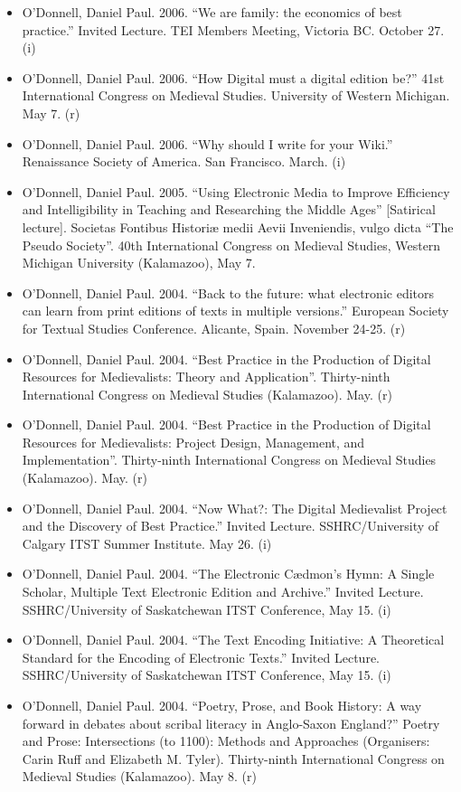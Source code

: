\documentclass[12pt]{article}
\begin{document}
\begin{itemize}
  \item O'Donnell, Daniel Paul. 2006. “We are family: the economics of best practice.” Invited Lecture. TEI Members Meeting, Victoria BC. October 27. (i)
  \item O'Donnell, Daniel Paul. 2006. “How Digital must a digital edition be?” 41st International Congress on Medieval Studies. University of Western Michigan. May 7. (r)
  \item O'Donnell, Daniel Paul. 2006. “Why should I write for your Wiki.” Renaissance Society of America. San Francisco. March. (i)
  \item O'Donnell, Daniel Paul. 2005. “Using Electronic Media to Improve Efficiency and Intelligibility in Teaching and Researching the Middle Ages” [Satirical lecture]. Societas Fontibus Historiæ medii Aevii Inveniendis, vulgo dicta “The Pseudo Society”. 40th International Congress on Medieval Studies, Western Michigan University (Kalamazoo), May 7.
  \item O'Donnell, Daniel Paul. 2004. “Back to the future: what electronic editors can learn from print editions of texts in multiple versions.” European Society for Textual Studies Conference. Alicante, Spain. November 24-25. (r)
  \item O'Donnell, Daniel Paul. 2004. “Best Practice in the Production of Digital Resources for Medievalists: Theory and Application”. Thirty-ninth International Congress on Medieval Studies (Kalamazoo). May. (r)
  \item O'Donnell, Daniel Paul. 2004. “Best Practice in the Production of Digital Resources for Medievalists: Project Design, Management, and Implementation”. Thirty-ninth International Congress on Medieval Studies (Kalamazoo). May. (r)
  \item O'Donnell, Daniel Paul. 2004. “Now What?: The Digital Medievalist Project and the Discovery of Best Practice.” Invited Lecture. SSHRC/University of Calgary ITST Summer Institute. May 26. (i)
  \item O'Donnell, Daniel Paul. 2004. “The Electronic Cædmon's Hymn: A Single Scholar, Multiple Text Electronic Edition and Archive.” Invited Lecture. SSHRC/University of Saskatchewan ITST Conference, May 15. (i)
  \item O'Donnell, Daniel Paul. 2004. “The Text Encoding Initiative: A Theoretical Standard for the Encoding of Electronic Texts.” Invited Lecture. SSHRC/University of Saskatchewan ITST Conference, May 15. (i)
  \item O'Donnell, Daniel Paul. 2004. “Poetry, Prose, and Book History: A way forward in debates about scribal literacy in Anglo-Saxon England?” Poetry and Prose: Intersections (to 1100): Methods and Approaches (Organisers: Carin Ruff and Elizabeth M. Tyler). Thirty-ninth International Congress on Medieval Studies (Kalamazoo). May 8. (r)

\end{itemize}
\end{document}
